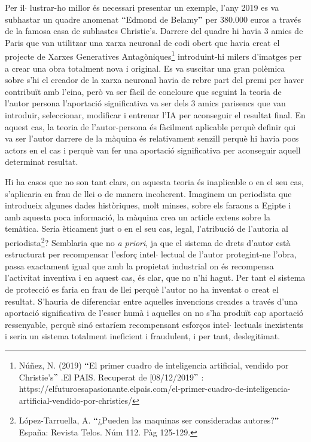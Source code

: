 \documentclass[12pt]{article}
\begin{document}
\vspace{\baselineskip}
\begin{justify}
Per il$ \cdot $ lustrar-ho millor és necessari presentar un exemple, l’any 2019 es va subhastar un quadre anomenat $``$Edmond de Belamy$"$  per 380.000 euros a través de la famosa casa de subhastes Christie’s. Darrere del quadre hi havia 3 amics de Paris que van utilitzar una xarxa neuronal de codi obert que havia creat el projecte de Xarxes Generatives Antagòniques\footnote{ Núñez, N. (2019) $``$El primer cuadro de inteligencia artificial, vendido por Christie’s$"$ .El PAIS. Recuperat de [08/12/2019$"$ : https://elfuturoesapasionante.elpais.com/el-primer-cuadro-de-inteligencia-artificial-vendido-por-christies/ } introduint-hi milers d’imatges per a crear una obra totalment nova i original. Es va suscitar una gran polèmica sobre s’hi el creador de la xarxa neuronal havia de rebre part del premi per haver contribuït amb l’eina, però va ser fàcil de concloure que seguint la teoria de l’autor persona l’aportació significativa va ser dels 3 amics parisencs que van introduir, seleccionar, modificar i entrenar l’IA per aconseguir el resultat final. En aquest cas, la teoria de l’autor-persona és fàcilment aplicable perquè definir qui va ser  l’autor darrere de la màquina és relativament senzill perquè hi havia pocs actors en el cas i perquè van fer una aportació significativa per aconseguir aquell determinat resultat.  
\end{justify}\par


\vspace{\baselineskip}
\begin{justify}
Hi ha casos que no son tant clars, on aquesta teoria és inaplicable o en el seu cas, s’aplicaria en frau de llei o de manera incoherent. Imaginem un periodista que introdueix algunes dades històriques, molt minses, sobre els faraons a Egipte i amb aquesta poca informació, la màquina crea un article extens sobre la temàtica. Seria èticament just o en el seu cas, legal, l’atribució de l’autoria al periodista\footnote{ López-Tarruella, A. $``$¿Pueden las maquinas ser consideradas autores?$"$  España: Revista Telos. Núm 112. Pàg 125-129.  }? Semblaria que no \textit{a priori}, ja que el sistema de drets d’autor està estructurat per recompensar l’esforç intel$ \cdot $ lectual de l’autor protegint-ne l’obra, passa exactament igual que amb la propietat industrial on és recompensa l’activitat inventiva i en aquest cas, és clar, que no n’hi hagut. Per tant el sistema de protecció es faria en frau de llei perquè l’autor no ha inventat o creat el resultat. S’hauria de diferenciar entre aquelles invencions creades a través d’una aportació significativa de l’esser humà i aquelles on no s’ha produït cap aportació ressenyable, perquè sinó estaríem recompensant esforços intel$ \cdot $ lectuals inexistents i seria un sistema totalment ineficient i fraudulent, i per tant, deslegitimat. 
\end{justify}\par
\end{document}
